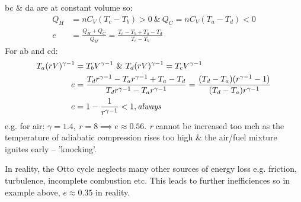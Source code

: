 \documentclass[a4paper, 11pt, normalem]{report}
\begin{document}
bc \& da are at constant volume so:
\begin{align}
    Q_{H} &= nC_{V}(T_{c} - T_{b}) > 0 ~\&~ Q_{C} = nC_{V}(T_{a} - T_{d}) < 0 \\
    e &= \frac{Q_{H} + Q_{C}}{Q_{H}} = \frac{T_{c} - T_{b} + T_{a} - T_{d}}{T_{c} - T_{b}}
\end{align}
For ab and cd:
\begin{align}
    T_{a}(rV)^{\gamma - 1} &= T_{b}V^{\gamma - 1} ~\&~ T_{d}(rV)^{\gamma - 1} = T_{c}V^{\gamma - 1} \\
    e &= \frac{T_{d}r^{\gamma - 1} - T_{a}r^{\gamma - 1} + T_{a} - T_{d}}{T_{d}r^{\gamma - 1} - T_{a}r^{\gamma - 1}} = \frac{(T_{d} - T_{a})(r^{\gamma - 1} - 1)}{(T_{d} - T_{a})r^{\gamma - 1}} \\
    e &= 1 - \frac{1}{r^{\gamma - 1}} < 1, \emph{\text{always}}
\end{align}
e.g. for air: $\gamma = 1.4, ~ r = 8 \implies e \approx 0.56$.
\emph{r} cannot be increased too mch as the temperature of adiabatic compression rises too high \& the air/fuel mixture ignites early -- 'knocking'.

In reality, the Otto cycle neglects many other sources of energy loss e.g. friction, turbulence, incomplete combustion etc.
This leads to further inefficiences so in example above, $e \approx 0.35$ in reality.
\end{document}
